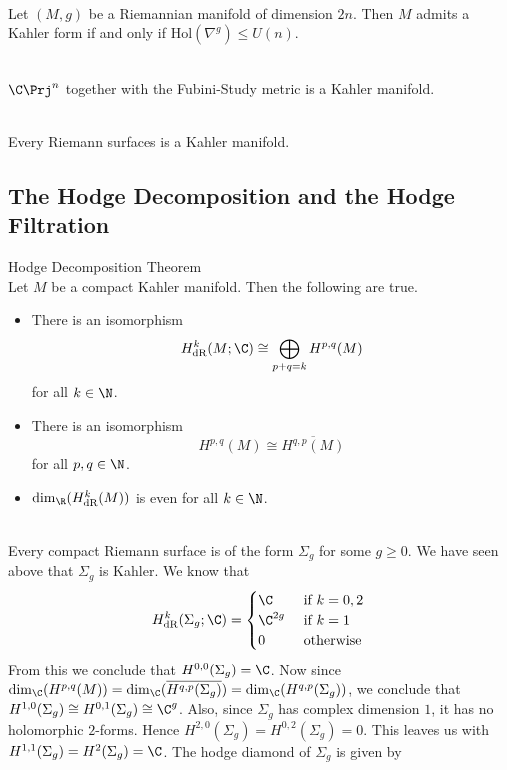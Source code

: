 \documentclass[a4paper]{article}
\begin{document}
\begin{prp}{}{}\\
Let $(M,g)$ be a Riemannian manifold of dimension $2n$. Then $M$ admits a Kahler form if and only if $\text{Hol}(\nabla^g)\leq U(n)$. 
\end{prp}

\begin{eg}{}{}\\
$\C\Prj^n$ together with the Fubini-Study metric is a Kahler manifold. 
\end{eg}

\begin{eg}{}{}\\
Every Riemann surfaces is a Kahler manifold. 
\end{eg}

\subsection{The Hodge Decomposition and the Hodge Filtration}
\begin{thm}{Hodge Decomposition Theorem}{}\\
Let $M$ be a compact Kahler manifold. Then the following are true. 
\begin{itemize}
\item There is an isomorphism $$H_\text{dR}^k(M;\C)\cong\bigoplus_{p+q=k}H^{p,q}(M)$$ for all $k\in\N$. 
\item There is an isomorphism $$H^{p,q}(M)\cong\overline{H^{q,p}(M)}$$ for all $p,q\in\N$. 
\item $\dim_\R(H_\text{dR}^k(M))$ is even for all $k\in\N$. 
\end{itemize}
\end{thm}

\begin{eg}{}{}\\
Every compact Riemann surface is of the form $\Sigma_g$ for some $g\geq 0$. We have seen above that $\Sigma_g$ is Kahler. We know that $$H_\text{dR}^k(\Sigma_g;\C)=\begin{cases}
\C & \text{ if }k=0,2\\
\C^{2g} & \text{ if }k=1\\
0 & \text{ otherwise }
\end{cases}$$
From this we conclude that $H^{0,0}(\Sigma_g)=\C$. Now since $\dim_\C(H^{p,q}(M))=\dim_\C(\overline{H^{q,p}(\Sigma_g)})=\dim_\C(H^{q,p}(\Sigma_g))$, we conclude that $H^{1,0}(\Sigma_g)\cong H^{0,1}(\Sigma_g)\cong\C^g$. Also, since $\Sigma_g$ has complex dimension $1$, it has no holomorphic $2$-forms. Hence $H^{2,0}(\Sigma_g)=H^{0,2}(\Sigma_g)=0$. This leaves us with $H^{1,1}(\Sigma_g)=H^2(\Sigma_g)=\C$. The hodge diamond of $\Sigma_g$ is given by  \\
 \\
\end{eg}
\end{document}
